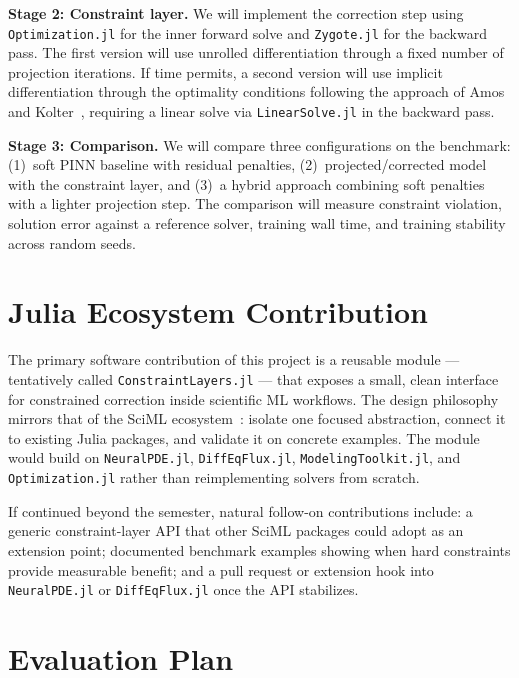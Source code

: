 \documentclass[12pt]{extarticle}
\begin{document}
\textbf{Stage 2: Constraint layer.}
We will implement the correction step using \texttt{Optimization.jl} for the
inner forward solve and \texttt{Zygote.jl} for the backward pass. The first
version will use unrolled differentiation through a fixed number of projection
iterations. If time permits, a second version will use implicit
differentiation through the optimality conditions following the approach of
Amos and Kolter~\cite{amos2017}, requiring a linear solve via
\texttt{LinearSolve.jl} in the backward pass.

\textbf{Stage 3: Comparison.}
We will compare three configurations on the benchmark: (1)~soft PINN
baseline with residual penalties, (2)~projected/corrected model with the
constraint layer, and (3)~a hybrid approach combining soft penalties with a
lighter projection step. The comparison will measure constraint violation,
solution error against a reference solver, training wall time, and training
stability across random seeds.

\section*{Julia Ecosystem Contribution}

The primary software contribution of this project is a reusable module ---
tentatively called \texttt{ConstraintLayers.jl} --- that exposes a small,
clean interface for constrained correction inside scientific ML workflows.
The design philosophy mirrors that of the SciML ecosystem~\cite{rackauckas2022}:
isolate one focused abstraction, connect it to existing Julia packages, and
validate it on concrete examples.
The module would build on \texttt{NeuralPDE.jl}, \texttt{DiffEqFlux.jl},
\texttt{ModelingToolkit.jl}, and \texttt{Optimization.jl} rather than
reimplementing solvers from scratch.

If continued beyond the semester, natural follow-on contributions include: a
generic constraint-layer API that other SciML packages could adopt as an
extension point; documented benchmark examples showing when hard constraints
provide measurable benefit; and a pull request or extension hook into
\texttt{NeuralPDE.jl} or \texttt{DiffEqFlux.jl} once the API stabilizes.

\section*{Evaluation Plan}
\end{document}
